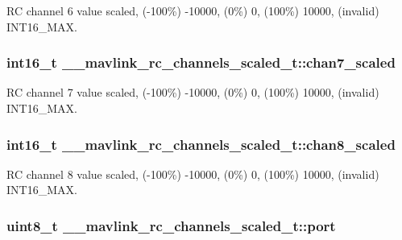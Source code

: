 R\+C channel 6 value scaled, (-\/100\%) -\/10000, (0\%) 0, (100\%) 10000, (invalid) I\+N\+T16\+\_\+\+M\+A\+X. 

\hypertarget{struct____mavlink__rc__channels__scaled__t_a1e3c67b2bff9476d2c2da3e757993a1b}{
\subsubsection[{chan7\+\_\+scaled}]{\setlength{\rightskip}{0pt plus 5cm}int16\+\_\+t \+\_\+\+\_\+mavlink\+\_\+rc\+\_\+channels\+\_\+scaled\+\_\+t\+::chan7\+\_\+scaled}}\label{struct____mavlink__rc__channels__scaled__t_a1e3c67b2bff9476d2c2da3e757993a1b}


R\+C channel 7 value scaled, (-\/100\%) -\/10000, (0\%) 0, (100\%) 10000, (invalid) I\+N\+T16\+\_\+\+M\+A\+X. 

\hypertarget{struct____mavlink__rc__channels__scaled__t_a53c6f6016f7f9e8a93ed1b1b959e1de7}{
\subsubsection[{chan8\+\_\+scaled}]{\setlength{\rightskip}{0pt plus 5cm}int16\+\_\+t \+\_\+\+\_\+mavlink\+\_\+rc\+\_\+channels\+\_\+scaled\+\_\+t\+::chan8\+\_\+scaled}}\label{struct____mavlink__rc__channels__scaled__t_a53c6f6016f7f9e8a93ed1b1b959e1de7}


R\+C channel 8 value scaled, (-\/100\%) -\/10000, (0\%) 0, (100\%) 10000, (invalid) I\+N\+T16\+\_\+\+M\+A\+X. 

\hypertarget{struct____mavlink__rc__channels__scaled__t_a8781afa3337e7a7e4b88b66569dcdf5a}{
\subsubsection[{port}]{\setlength{\rightskip}{0pt plus 5cm}uint8\+\_\+t \+\_\+\+\_\+mavlink\+\_\+rc\+\_\+channels\+\_\+scaled\+\_\+t\+::port}}\label{struct____mavlink__rc__channels__scaled__t_a8781afa3337e7a7e4b88b66569dcdf5a}


